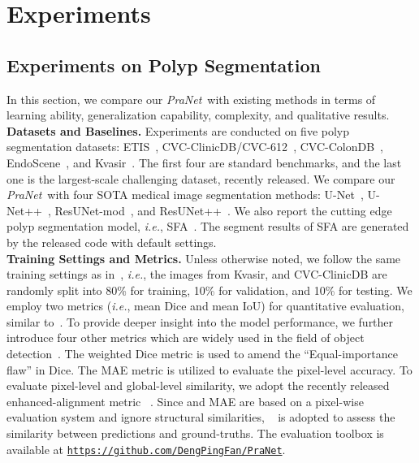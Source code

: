 \documentclass[runningheads]{llncs}
\def\ie{\emph{i.e.}}
\def\ourmodel{\textit{PraNet}}
\begin{document}
\section{Experiments}\label{sec:Experiments}

\subsection{Experiments on Polyp Segmentation}\label{sec:CmpSOTAS}
In this section, we compare our \ourmodel~with existing methods in terms of learning ability, generalization capability, complexity, and qualitative results. \\

\noindent\textbf{Datasets and Baselines.} Experiments are conducted on five polyp segmentation datasets: ETIS~\cite{silva2014toward},
CVC-ClinicDB/CVC-612~\cite{bernal2015wm}, CVC-ColonDB~\cite{tajbakhsh2015automated}, 
EndoScene~\cite{vazquez2017benchmark}, and Kvasir~\cite{jha2020kvasir}. 
The first four are standard benchmarks, and the last one is the largest-scale challenging dataset, recently released. We compare our \ourmodel~with four SOTA medical image segmentation methods: U-Net~\cite{ronneberger2015u}, U-Net++~\cite{zhou2018unetplus}, ResUNet-mod~\cite{zhang2018road}, and ResUNet++~\cite{jha2019resunetplus}. We also report the cutting edge polyp segmentation model, \ie, SFA~\cite{fang2019selective}. 
The segment results of SFA are generated by the released code with default settings. \\

\noindent\textbf{Training Settings and Metrics.} Unless otherwise noted, we follow the same training settings as in~\cite{jha2019resunetplus}, \ie, the images from Kvasir, and CVC-ClinicDB are randomly split into 80\% for training, 10\% for validation, and 10\% for testing.  
We employ two metrics (\ie, mean Dice and mean IoU) for quantitative evaluation, similar to~\cite{jha2019resunetplus,jha2020kvasir}. To provide deeper insight into the model performance, we further introduce four other metrics which are widely used in the field of object detection~\cite{fan2020camouflaged,Zhang2020UCNet,fan2018salient,fu2020jl,zhao2019contrast,zhao2019egnet}. The weighted Dice metric  is used to amend the ``Equal-importance flaw'' in Dice. The MAE metric is utilized to evaluate the pixel-level accuracy. To evaluate pixel-level and global-level similarity, we adopt the recently released enhanced-alignment metric ~\cite{Fan2018Enhanced}. Since  and MAE are based on a pixel-wise evaluation system and ignore structural similarities, ~\cite{fan2017structure} is adopted to assess the similarity between predictions and ground-truths. The evaluation toolbox is available at {\tt \href{https://github.com/DengPingFan/PraNet}{https://github.com/DengPingFan/PraNet}}.
\\ 
\end{document}
